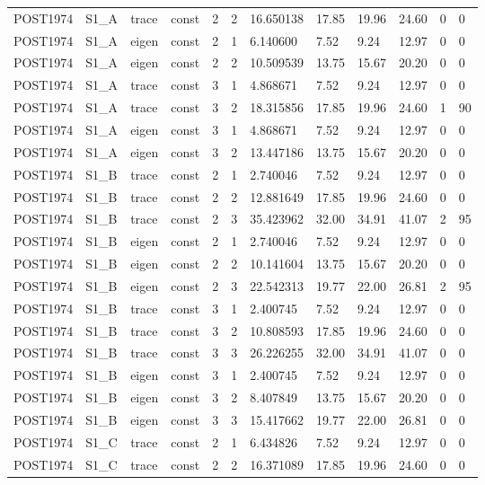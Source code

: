 \begin{tabular}{llllllllllll}
POST1974 & S1\_A & trace & const & 2 & 2 & 16.650138 & 17.85 & 19.96 & 24.60 & 0 & 0 \\
POST1974 & S1\_A & eigen & const & 2 & 1 & 6.140600 & 7.52 & 9.24 & 12.97 & 0 & 0 \\
POST1974 & S1\_A & eigen & const & 2 & 2 & 10.509539 & 13.75 & 15.67 & 20.20 & 0 & 0 \\
POST1974 & S1\_A & trace & const & 3 & 1 & 4.868671 & 7.52 & 9.24 & 12.97 & 0 & 0 \\
POST1974 & S1\_A & trace & const & 3 & 2 & 18.315856 & 17.85 & 19.96 & 24.60 & 1 & 90 \\
POST1974 & S1\_A & eigen & const & 3 & 1 & 4.868671 & 7.52 & 9.24 & 12.97 & 0 & 0 \\
POST1974 & S1\_A & eigen & const & 3 & 2 & 13.447186 & 13.75 & 15.67 & 20.20 & 0 & 0 \\
POST1974 & S1\_B & trace & const & 2 & 1 & 2.740046 & 7.52 & 9.24 & 12.97 & 0 & 0 \\
POST1974 & S1\_B & trace & const & 2 & 2 & 12.881649 & 17.85 & 19.96 & 24.60 & 0 & 0 \\
POST1974 & S1\_B & trace & const & 2 & 3 & 35.423962 & 32.00 & 34.91 & 41.07 & 2 & 95 \\
POST1974 & S1\_B & eigen & const & 2 & 1 & 2.740046 & 7.52 & 9.24 & 12.97 & 0 & 0 \\
POST1974 & S1\_B & eigen & const & 2 & 2 & 10.141604 & 13.75 & 15.67 & 20.20 & 0 & 0 \\
POST1974 & S1\_B & eigen & const & 2 & 3 & 22.542313 & 19.77 & 22.00 & 26.81 & 2 & 95 \\
POST1974 & S1\_B & trace & const & 3 & 1 & 2.400745 & 7.52 & 9.24 & 12.97 & 0 & 0 \\
POST1974 & S1\_B & trace & const & 3 & 2 & 10.808593 & 17.85 & 19.96 & 24.60 & 0 & 0 \\
POST1974 & S1\_B & trace & const & 3 & 3 & 26.226255 & 32.00 & 34.91 & 41.07 & 0 & 0 \\
POST1974 & S1\_B & eigen & const & 3 & 1 & 2.400745 & 7.52 & 9.24 & 12.97 & 0 & 0 \\
POST1974 & S1\_B & eigen & const & 3 & 2 & 8.407849 & 13.75 & 15.67 & 20.20 & 0 & 0 \\
POST1974 & S1\_B & eigen & const & 3 & 3 & 15.417662 & 19.77 & 22.00 & 26.81 & 0 & 0 \\
POST1974 & S1\_C & trace & const & 2 & 1 & 6.434826 & 7.52 & 9.24 & 12.97 & 0 & 0 \\
POST1974 & S1\_C & trace & const & 2 & 2 & 16.371089 & 17.85 & 19.96 & 24.60 & 0 & 0 \\

\end{tabular}

